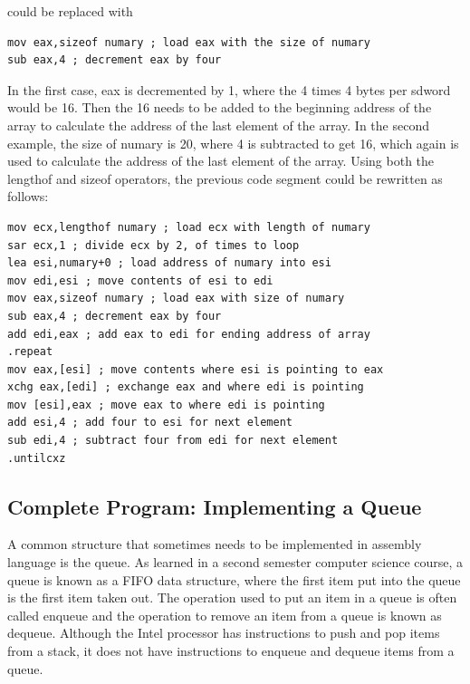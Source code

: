 \documentclass[10pt]{book}
\begin{document}
could be replaced with

\begin{verbatim}
mov eax,sizeof numary ; load eax with the size of numary
sub eax,4 ; decrement eax by four
\end{verbatim}

In the first case, eax is decremented by 1, where the 4 times 4 bytes per sdword would be 16. Then the 16 needs to be added to the beginning address of the array to calculate the address of the last element of the array. In the second example, the size of numary is 20, where 4 is subtracted to get 16, which again is used to calculate the address of the last element of the array. Using both the lengthof and sizeof operators, the previous code segment could be rewritten as follows:
\begin{verbatim}
mov ecx,lengthof numary ; load ecx with length of numary
sar ecx,1 ; divide ecx by 2, of times to loop
lea esi,numary+0 ; load address of numary into esi
mov edi,esi ; move contents of esi to edi
mov eax,sizeof numary ; load eax with size of numary
sub eax,4 ; decrement eax by four
add edi,eax ; add eax to edi for ending address of array
.repeat
mov eax,[esi] ; move contents where esi is pointing to eax
xchg eax,[edi] ; exchange eax and where edi is pointing
mov [esi],eax ; move eax to where edi is pointing
add esi,4 ; add four to esi for next element
sub edi,4 ; subtract four from edi for next element
.untilcxz
\end{verbatim}

\subsection{Complete Program: Implementing a Queue}
A common structure that sometimes needs to be implemented in assembly language is the queue. As learned in a second semester computer science course, a queue is known as a FIFO data structure, where the first item put into the queue is the first item taken out. The operation used to put an item in a queue is often called enqueue and the operation to remove an item from a queue is known as dequeue. Although the Intel processor has instructions to push and pop items from a stack, it does not have instructions to enqueue and dequeue items from a queue.
\end{document}
